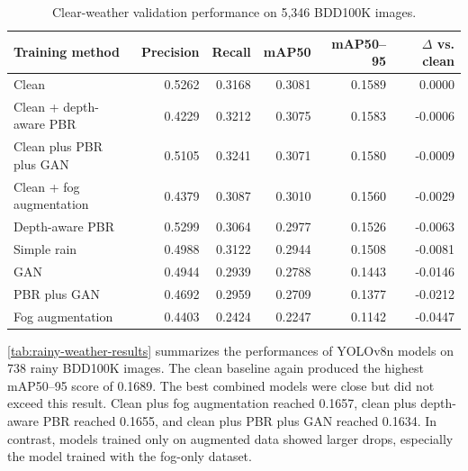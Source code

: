 \documentclass[10pt,letterpaper]{article}
\begin{document}
\begin{table}[!htbp]
\centering
\caption{Clear-weather validation performance on 5,346 BDD100K images.}
\label{tab:clear-weather-results}
\begin{tabular*}{\textwidth}{@{\extracolsep{\fill}}lrrrrr@{}}
\toprule
Training method & Precision & Recall & mAP50 & mAP50--95 & $\Delta$ vs. clean \\
\midrule
Clean & 0.5262 & 0.3168 & 0.3081 & 0.1589 & 0.0000 \\
Clean + depth-aware PBR & 0.4229 & 0.3212 & 0.3075 & 0.1583 & -0.0006 \\
Clean plus PBR plus GAN & 0.5105 & 0.3241 & 0.3071 & 0.1580 & -0.0009 \\
Clean + fog augmentation & 0.4379 & 0.3087 & 0.3010 & 0.1560 & -0.0029 \\
Depth-aware PBR & 0.5299 & 0.3064 & 0.2977 & 0.1526 & -0.0063 \\
Simple rain & 0.4988 & 0.3122 & 0.2944 & 0.1508 & -0.0081 \\
GAN & 0.4944 & 0.2939 & 0.2788 & 0.1443 & -0.0146 \\
PBR plus GAN & 0.4692 & 0.2959 & 0.2709 & 0.1377 & -0.0212 \\
Fog augmentation & 0.4403 & 0.2424 & 0.2247 & 0.1142 & -0.0447 \\
\bottomrule
\end{tabular*}
\end{table}

\autoref{tab:rainy-weather-results} summarizes the performances of YOLOv8n models on 738 rainy BDD100K images. 
The clean baseline again produced the highest mAP50--95 score of 0.1689. The best combined models were close but did not exceed this result. 
Clean plus fog augmentation reached 0.1657, clean plus depth-aware PBR reached 0.1655, and clean plus PBR plus GAN reached 0.1634. 
In contrast, models trained only on augmented data showed larger drops, especially the model trained with the fog-only dataset.
\end{document}
